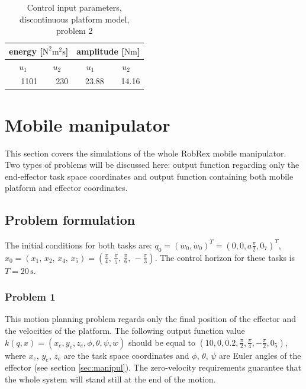 \begin{table}[htb]
\caption{Control input parameters, discontinuous platform model, problem 2}
\label{tab:in_discont_ok}
\centering
\begin{tabular}{|r|r|r|r|}
\hline
\multicolumn{2}{|c|}{energy [$\mathrm{N^2m^2s}$]}                             & \multicolumn{2}{c|}{amplitude [$\mathrm{Nm}$]}                          \\ \hline
\multicolumn{1}{|c|}{$u_1$} & \multicolumn{1}{c|}{$u_2$} & \multicolumn{1}{c|}{$u_1$} & \multicolumn{1}{c|}{$u_2$} \\ \hline
1101                       & 230                        & 23.88                      & 14.16                      \\ \hline
\end{tabular}
\end{table}



\section{Mobile manipulator}
This section covers the simulations of the whole RobRex mobile manipulator. Two types of problems will
be discussed here: output function regarding only the end-effector task space coordinates
and output function containing both mobile platform and effector coordinates.
\subsection{Problem formulation}
The initial conditions for both tasks are: $q_0 = (w_0, \dot{w}_0)^T = (0, 0, a\frac{\pi}{2}, 0_7)^T$, 
$x_0 = \left(
x_1 ,\, x_2 ,\, x_4 ,\, x_5
\right) = \left(
\frac{\pi}{4} ,\, \frac{\pi}{5} ,\, \frac{\pi}{6} ,\, -\frac{\pi}{3}
\right).$ The control horizon for these tasks is $T=20\,\mathrm{s}$.
\subsubsection{Problem 1}
This motion planning problem regards only the final position of the effector
and the velocities of the platform. 
The following output function value $k(q, x) = (x_e, y_e, z_e, \phi, \theta, \psi, \dot w) $ should be equal to
$(10, 0, 0.2, \frac{\pi}{2}, \frac{\pi}{4}, -\frac{\pi}{2}, 0_5)$, where
$x_e$, $y_e$, $z_e$ are the task space coordinates and $\phi$, $\theta$, $\psi$
are Euler angles of the effector (see section \ref{sec:manipul}). The zero-velocity
requirements guarantee that the whole system will stand still at the end
of the motion.
